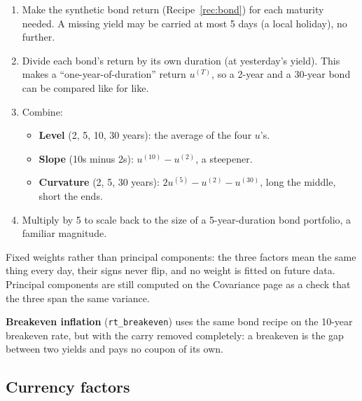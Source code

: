 \documentclass[11pt,a4paper]{article}
\newcommand{\fid}[1]{\texttt{#1}}
\begin{document}
\begin{method}
\begin{enumerate}[leftmargin=1.4em]
  \item Make the synthetic bond return (Recipe~\ref{rec:bond}) for each maturity needed. A missing yield may be carried at most 5 days (a local holiday), no further.
  \item Divide each bond's return by its own duration (at yesterday's yield). This makes a ``one-year-of-duration'' return $u^{(T)}$, so a 2-year and a 30-year bond can be compared like for like.
  \item Combine:
  \begin{itemize}[leftmargin=1.2em]
    \item \textbf{Level} (2, 5, 10, 30 years): the average of the four $u$'s.
    \item \textbf{Slope} (10s minus 2s): $u^{(10)} - u^{(2)}$, a steepener.
    \item \textbf{Curvature} (2, 5, 30 years): $2u^{(5)} - u^{(2)} - u^{(30)}$, long the middle, short the ends.
  \end{itemize}
  \item Multiply by 5 to scale back to the size of a 5-year-duration bond portfolio, a familiar magnitude.
\end{enumerate}
\end{method}

\begin{tip}
Fixed weights rather than principal components: the three factors mean the same
thing every day, their signs never flip, and no weight is fitted on future data.
Principal components are still computed on the Covariance page as a check that the
three span the same variance.
\end{tip}

\textbf{Breakeven inflation} (\fid{rt\_breakeven}) uses the same bond recipe on the
10-year breakeven rate, but with the carry removed completely: a breakeven is the
gap between two yields and pays no coupon of its own.

\subsection{Currency factors}
\end{document}
